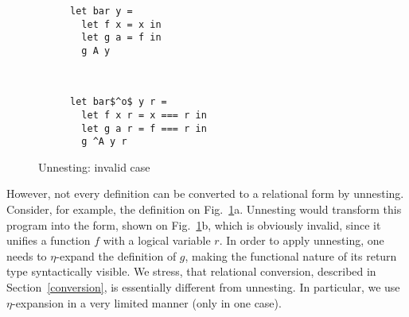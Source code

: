 \begin{figure}[t]
\centering
\begin{subfigure}[t]{0.4\textwidth}
 \centering
\begin{lstlisting}
let bar y =
  let f x = x in
  let g a = f in
  g A y
\end{lstlisting}
\vspace{-1\baselineskip}
    \caption{}
  \end{subfigure}
  ~
  \begin{subfigure}[t]{0.4\textwidth}
    \centering
\begin{lstlisting}
let bar$^o$ y r =
  let f x r = x === r in
  let g a r = f === r in
  g ^A y r
\end{lstlisting}
\vspace{-1\baselineskip}
  \caption{}
  \end{subfigure}
  \vskip4mm
\caption{Unnesting: invalid case}
\label{unnesting_invalid}
\end{figure}

However, not every definition can be converted to a relational form by unnesting. Consider, for example, the definition on Fig.~\ref{unnesting_invalid}a.
Unnesting would transform this program into the form, shown on Fig.~\ref{unnesting_invalid}b, which is obviously invalid, since it unifies a
function $f$ with a logical variable $r$. In order to apply unnesting, one needs to $\eta$-expand the definition of $g$, making the functional nature of
its return type syntactically visible.
We stress, that relational conversion, described in Section~\ref{conversion}, is essentially different from unnesting. In particular, 
we use $\eta$-expansion in a very limited manner (only in one case).

\begin{comment}

and for the aforementioned example the result of relational
conversion looks as follows:

\begin{lstlisting}
   let bar$^o$ y =
     let f x = x in
     let g a = f in
     g (fun q. q === ^A) y
\end{lstlisting}

Note, the majority of definitions are left intact; the only difference with the functional version comes from the use of the constructor 
\lstinline|A|, which was transformed into a goal-returning function.

\end{comment}


